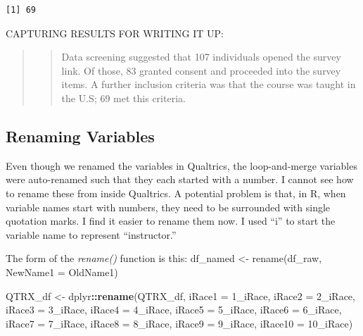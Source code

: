 \documentclass[
  11pt,
]{book}
\newenvironment{Shaded}{\begin{snugshade}}{\end{snugshade}}
\newcommand{\AttributeTok}[1]{\textcolor[rgb]{0.27,0.27,0.27}{#1}}
\newcommand{\FunctionTok}[1]{\textcolor[rgb]{0.27,0.27,0.27}{\textbf{#1}}}
\newcommand{\NormalTok}[1]{#1}
\newcommand{\OtherTok}[1]{\textcolor[rgb]{0.37,0.37,0.37}{#1}}
\newcommand{\SpecialCharTok}[1]{\textcolor[rgb]{0.43,0.43,0.43}{\textbf{#1}}}
\newcommand{\StringTok}[1]{\textcolor[rgb]{0.5,0.5,0.5}{#1}}
\begin{document}
\begin{verbatim}
[1] 69
\end{verbatim}

CAPTURING RESULTS FOR WRITING IT UP:

\begin{quote}
\begin{quote}
Data screening suggested that 107 individuals opened the survey link. Of those, 83 granted consent and proceeded into the survey items. A further inclusion criteria was that the course was taught in the U.S; 69 met this criteria.
\end{quote}
\end{quote}

\hypertarget{renaming-variables}{%
\subsection{Renaming Variables}\label{renaming-variables}}

Even though we renamed the variables in Qualtrics, the loop-and-merge variables were auto-renamed such that they each started with a number. I cannot see how to rename these from inside Qualtrics. A potential problem is that, in R, when variable names start with numbers, they need to be surrounded with single quotation marks. I find it easier to rename them now. I used ``i'' to start the variable name to represent ``instructor.''

The form of the \emph{rename()} function is this: df\_named \textless- rename(df\_raw, NewName1 = OldName1)

\begin{Shaded}
\begin{Highlighting}[]
\NormalTok{QTRX\_df }\OtherTok{\textless{}{-}}\NormalTok{ dplyr}\SpecialCharTok{::}\FunctionTok{rename}\NormalTok{(QTRX\_df, }\AttributeTok{iRace1 =} \StringTok{\textquotesingle{}1\_iRace\textquotesingle{}}\NormalTok{, }\AttributeTok{iRace2 =} \StringTok{\textquotesingle{}2\_iRace\textquotesingle{}}\NormalTok{, }\AttributeTok{iRace3 =} \StringTok{\textquotesingle{}3\_iRace\textquotesingle{}}\NormalTok{, }\AttributeTok{iRace4 =} \StringTok{\textquotesingle{}4\_iRace\textquotesingle{}}\NormalTok{, }\AttributeTok{iRace5 =} \StringTok{\textquotesingle{}5\_iRace\textquotesingle{}}\NormalTok{, }\AttributeTok{iRace6 =} \StringTok{\textquotesingle{}6\_iRace\textquotesingle{}}\NormalTok{, }\AttributeTok{iRace7 =} \StringTok{\textquotesingle{}7\_iRace\textquotesingle{}}\NormalTok{, }\AttributeTok{iRace8 =} \StringTok{\textquotesingle{}8\_iRace\textquotesingle{}}\NormalTok{, }\AttributeTok{iRace9 =} \StringTok{\textquotesingle{}9\_iRace\textquotesingle{}}\NormalTok{, }\AttributeTok{iRace10 =} \StringTok{\textquotesingle{}10\_iRace\textquotesingle{}}\NormalTok{)}
\end{Highlighting}
\end{Shaded}
\end{document}

